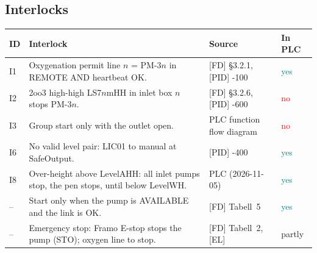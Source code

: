 \documentclass[11pt,a4paper]{article}
\newcommand{\impl}{\textcolor{teal}{\textsf{yes}}}
\newcommand{\notimpl}{\textcolor{red}{\textsf{no}}}
\begin{document}
\subsection{Interlocks}
\begin{small}
\begin{tabularx}{\textwidth}{@{}P{8mm}LP{30mm}P{16mm}@{}}
\toprule
ID & Interlock & Source & In PLC \\
\midrule
I1 & Oxygenation permit line $n$ = PM-3$n$ in REMOTE AND heartbeat OK. & [FD] \S3.2.1, [PID] -100 & \impl \\
I2 & 2oo3 high-high LS7$n$mHH in inlet box $n$ stops PM-3$n$. & [FD] \S3.2.6, [PID] -600 & \notimpl{} \\
I3 & Group start only with the outlet open. & PLC function flow diagram & \notimpl{} \\
I6 & No valid level pair: LIC01 to manual at SafeOutput. & [PID] -400 & \impl \\
I8 & Over-height above LevelAHH: all inlet pumps stop, the pen stops, until below LevelWH. & PLC (2026-11-05) & \impl \\
-- & Start only when the pump is AVAILABLE and the link is OK. & [FD] Tabell~5 & \impl \\
-- & Emergency stop: Framo E-stop stops the pump (STO); oxygen line to stop. & [FD] Tabell~2, [EL] & partly \\
\bottomrule
\end{tabularx}
\end{small}
\end{document}
